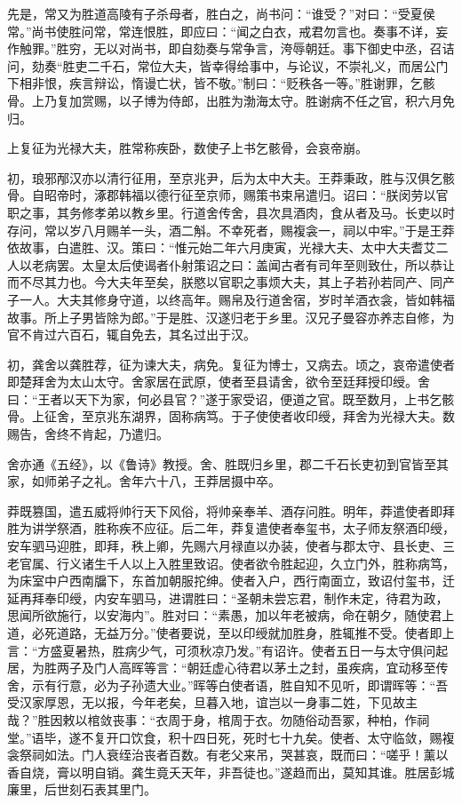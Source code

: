 \documentclass[]{article}
\begin{document}
先是，常又为胜道高陵有子杀母者，胜白之，尚书问：``谁受？''对曰：``受夏侯常。''尚书使胜问常，常连恨胜，即应曰：``闻之白衣，戒君勿言也。奏事不详，妄作触罪。''胜穷，无以对尚书，即自劾奏与常争言，洿辱朝廷。事下御史中丞，召诘问，劾奏``胜吏二千石，常位大夫，皆幸得给事中，与论议，不崇礼义，而居公门下相非恨，疾言辩讼，惰谩亡状，皆不敬。''制曰：``贬秩各一等。''胜谢罪，乞骸骨。上乃复加赏赐，以子博为侍郎，出胜为渤海太守。胜谢病不任之官，积六月免归。

上复征为光禄大夫，胜常称疾卧，数使子上书乞骸骨，会哀帝崩。

初，琅邪邴汉亦以清行征用，至京兆尹，后为太中大夫。王莽秉政，胜与汉俱乞骸骨。自昭帝时，涿郡韩福以德行征至京师，赐策书束帛遣归。诏曰：``朕闵劳以官职之事，其务修孝弟以教乡里。行道舍传舍，县次具酒肉，食从者及马。长吏以时存问，常以岁八月赐羊一头，酒二斛。不幸死者，赐複衾一，祠以中牢。''于是王莽依故事，白遣胜、汉。策曰：``惟元始二年六月庚寅，光禄大夫、太中大夫耆艾二人以老病罢。太皇太后使谒者仆射策诏之曰：盖闻古者有司年至则致仕，所以恭让而不尽其力也。今大夫年至矣，朕愍以官职之事烦大夫，其上子若孙若同产、同产子一人。大夫其修身守道，以终高年。赐帛及行道舍宿，岁时羊酒衣衾，皆如韩福故事。所上子男皆除为郎。''于是胜、汉遂归老于乡里。汉兄子曼容亦养志自修，为官不肯过六百石，辄自免去，其名过出于汉。

初，龚舍以龚胜荐，征为谏大夫，病免。复征为博士，又病去。顷之，哀帝遣使者即楚拜舍为太山太守。舍家居在武原，使者至县请舍，欲令至廷拜授印绶。舍曰：``王者以天下为家，何必县官？''遂于家受诏，便道之官。既至数月，上书乞骸骨。上征舍，至京兆东湖界，固称病笃。于子使使者收印绶，拜舍为光禄大夫。数赐告，舍终不肯起，乃遣归。

舍亦通《五经》，以《鲁诗》教授。舍、胜既归乡里，郡二千石长吏初到官皆至其家，如师弟子之礼。舍年六十八，王莽居摄中卒。

莽既篡国，遣五威将帅行天下风俗，将帅亲奉羊、酒存问胜。明年，莽遣使者即拜胜为讲学祭酒，胜称疾不应征。后二年，莽复遣使者奉玺书，太子师友祭酒印绶，安车驷马迎胜，即拜，秩上卿，先赐六月禄直以办装，使者与郡太守、县长吏、三老官属、行义诸生千人以上入胜里致诏。使者欲令胜起迎，久立门外，胜称病笃，为床室中户西南牖下，东首加朝服拕绅。使者入户，西行南面立，致诏付玺书，迁延再拜奉印绶，内安车驷马，进谓胜曰：``圣朝未尝忘君，制作未定，待君为政，思闻所欲施行，以安海内''。胜对曰：``素愚，加以年老被病，命在朝夕，随使君上道，必死道路，无益万分。''使者要说，至以印绶就加胜身，胜辄推不受。使者即上言：``方盛夏暑热，胜病少气，可须秋凉乃发。''有诏许。使者五日一与太守俱问起居，为胜两子及门人高晖等言：``朝廷虚心待君以茅土之封，虽疾病，宜动移至传舍，示有行意，必为子孙遗大业。''晖等白使者语，胜自知不见听，即谓晖等：``吾受汉家厚恩，无以报，今年老矣，旦暮入地，谊岂以一身事二姓，下见故主哉？''胜因敕以棺敛丧事：``衣周于身，棺周于衣。勿随俗动吾冢，种柏，作祠堂。''语毕，遂不复开口饮食，积十四日死，死时七十九矣。使者、太守临敛，赐複衾祭祠如法。门人衰绖治丧者百数。有老父来吊，哭甚哀，既而曰：``嗟乎！薰以香自烧，膏以明自销。龚生竟夭天年，非吾徒也。''遂趋而出，莫知其谁。胜居彭城廉里，后世刻石表其里门。
\end{document}
